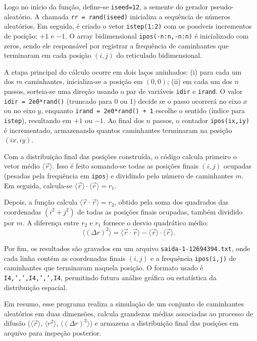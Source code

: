 Logo no início da função, define-se \texttt{iseed=12}, a semente do gerador pseudo-aleatório. 
A chamada \texttt{rr = rand(iseed)} inicializa a sequência de números aleatórios.  
Em seguida, é criado o vetor \texttt{istep(1:2)} com os possíveis incrementos de posição: 
$+1$ e $-1$. O array bidimensional \texttt{ipos(-n:n,-n:n)} é inicializado com zeros, 
sendo ele responsável por registrar a frequência de caminhantes que terminaram em cada posição $(i,j)$ 
do reticulado bidimensional.  

A etapa principal do cálculo ocorre em dois laços aninhados:  
(i) para cada um dos $m$ caminhantes, inicializa-se a posição em $(0,0)$;  
(ii) em cada um dos $n$ passos, sorteia-se uma direção usando o par de variáveis 
\texttt{idir} e \texttt{irand}.  
O valor \texttt{idir = 2e0*rand()} (truncado para 0 ou 1) decide se o passo ocorrerá 
no eixo $x$ ou no eixo $y$, enquanto \texttt{irand = 2e0*rand() + 1} escolhe o sentido 
(índice para \texttt{istep}), resultando em $+1$ ou $-1$.  
Ao final dos $n$ passos, o contador \texttt{ipos(ix,iy)} é incrementado, armazenando 
quantos caminhantes terminaram na posição $(ix,iy)$.  

Com a distribuição final das posições construída, o código calcula primeiro o vetor médio 
$\langle \vec{r} \rangle$. Isso é feito somando-se todas as posições finais $(i,j)$ ocupadas 
(pesadas pela frequência em \texttt{ipos}) e dividindo pelo número de caminhantes $m$. 
Em seguida, calcula-se $\langle \vec{r}\rangle \cdot \langle \vec{r}\rangle = r_1$.  

Depois, a função calcula $\langle \vec{r}\cdot \vec{r}\rangle = r_2$, obtido pela soma dos 
quadrados das coordenadas $(i^2+j^2)$ de todas as posições finais ocupadas, também dividido por $m$.  
A diferença entre $r_2$ e $r_1$ fornece o desvio quadrático médio:  
\[
\langle (\Delta r)^2 \rangle = \langle \vec{r}\cdot \vec{r} \rangle - \langle \vec{r}\rangle \cdot \langle \vec{r}\rangle.
\]  

Por fim, os resultados são gravados em um arquivo \texttt{saida-1-12694394.txt}, 
onde cada linha contém as coordenadas finais $(i,j)$ e a frequência \texttt{ipos(i,j)} 
de caminhantes que terminaram naquela posição. O formato usado é \texttt{I4,',',I4,',',I4}, 
permitindo futura análise gráfica ou estatística da distribuição espacial.  

Em resumo, esse programa realiza a simulação de um conjunto de caminhantes aleatórios 
em duas dimensões, calcula grandezas médias associadas ao processo de difusão 
($\langle \vec{r} \rangle$, $\langle r^2 \rangle$, $\langle (\Delta r)^2 \rangle$) 
e armazena a distribuição final das posições em arquivo para inspeção posterior.  

